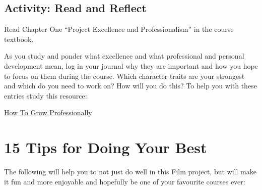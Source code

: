 \documentclass[
]{book}
\begin{document}
\hypertarget{activity-read-and-reflect}{%
\subsection*{Activity: Read and Reflect}\label{activity-read-and-reflect}}

\begin{reflect}
Read Chapter One ``Project Excellence and Professionalism'' in the course textbook.

As you study and ponder what excellence and what professional and personal development mean, log in your journal why they are important and how you hope to focus on them during the course. Which character traits are your strongest and which do you need to work on? How will you do this? To help you with these entries study this resource:

\href{https://brandyourself.com/blog/guide/how-to-grow-professionally/}{How To Grow Professionally}
\end{reflect}

\hypertarget{tips-for-doing-your-best}{%
\section{15 Tips for Doing Your Best}\label{tips-for-doing-your-best}}

The following will help you to not just do well in this Film project, but will make it fun and more enjoyable and hopefully be one of your favourite courses ever:
\end{document}
